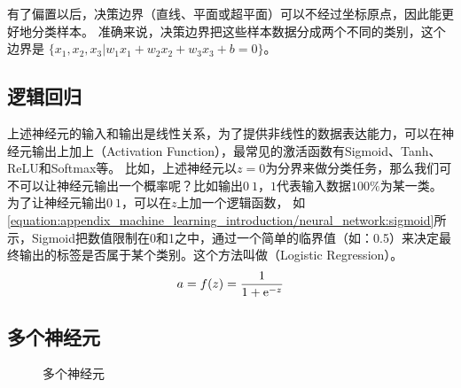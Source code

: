 \documentclass[letterpaper,10pt,english]{sphinxmanual}
\let\sphinxpxdimen\pdfpxdimen\else\newdimen\sphinxpxdimen
\begin{document}
\sphinxAtStartPar
有了偏置以后，决策边界（直线、平面或超平面）可以不经过坐标原点，因此能更好地分类样本。
准确来说，决策边界把这些样本数据分成两个不同的类别，这个边界是
\(\{x_1, x_2, x_3 | w_{1}x_{1}+ w_{2}x_{2}+ w_{3}x_{3} + b = 0\}\)。


\subsection{逻辑回归}
\label{\detokenize{appendix_machine_learning_introduction/neural_network:id3}}
\sphinxAtStartPar
上述神经元的输入和输出是线性关系，为了提供非线性的数据表达能力，可以在神经元输出上加上（Activation
Function），最常见的激活函数有Sigmoid、Tanh、ReLU和Softmax等。
比如，上述神经元以\(z=0\)为分界来做分类任务，那么我们可不可以让神经元输出一个概率呢？比如输出\(0~1\)，\(1\)代表输入数据\(100\%\)为某一类。
为了让神经元输出\(0~1\)，可以在\(z\)上加一个逻辑函数，
如
\eqref{equation:appendix_machine_learning_introduction/neural_network:sigmoid}所示，Sigmoid把数值限制在0和1之中，通过一个简单的临界值（如：0.5）来决定最终输出的标签是否属于某个类别。这个方法叫做（Logistic
Regression）。
\begin{equation}\label{equation:appendix_machine_learning_introduction/neural_network:sigmoid}
\begin{split}a = f({z}) = \frac{1}{1+{\rm e}^{-{z}}}\end{split}
\end{equation}

\subsection{多个神经元}
\label{\detokenize{appendix_machine_learning_introduction/neural_network:id4}}
\begin{figure}[H]
\centering
\capstart

\noindent\sphinxincludegraphics[width=600\sphinxpxdimen]{{two_neurons2}.png}
\caption{多个神经元}\label{\detokenize{appendix_machine_learning_introduction/neural_network:id18}}\label{\detokenize{appendix_machine_learning_introduction/neural_network:two-neurons2}}\end{figure}
\end{document}

